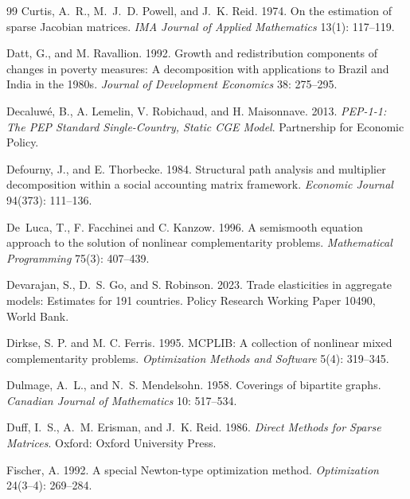 \begin{thebibliography}{99}
Curtis, A.~R., M.~J.~D. Powell, and J.~K. Reid. 1974.
\newblock On the estimation of sparse Jacobian matrices.
\newblock \emph{IMA Journal of Applied Mathematics} 13(1): 117--119.

Datt, G., and M. Ravallion. 1992.
\newblock Growth and redistribution components of changes in poverty
  measures: A decomposition with applications to {Brazil} and {India} in the
  1980s.
\newblock \emph{Journal of Development Economics} 38: 275--295.

Decaluw\'e, B., A. Lemelin, V. Robichaud, and H. Maisonnave. 2013.
\newblock \emph{PEP-1-1: The PEP Standard Single-Country, Static CGE Model}.
\newblock Partnership for Economic Policy.

Defourny, J., and E. Thorbecke. 1984.
\newblock Structural path analysis and multiplier decomposition within a
  social accounting matrix framework.
\newblock \emph{Economic Journal} 94(373): 111--136.

De~Luca, T., F. Facchinei and C. Kanzow. 1996.
\newblock A semismooth equation approach to the solution of nonlinear
  complementarity problems.
\newblock \emph{Mathematical Programming} 75(3): 407--439.

Devarajan, S., D.~S. Go, and S. Robinson. 2023.
\newblock Trade elasticities in aggregate models: Estimates for 191
  countries.
\newblock Policy Research Working Paper 10490, World Bank.

Dirkse, S. P. and M. C. Ferris. 1995.
\newblock MCPLIB: A collection of nonlinear mixed complementarity problems.
\newblock \emph{Optimization Methods and Software} 5(4): 319--345.

Dulmage, A.~L., and N.~S. Mendelsohn. 1958.
\newblock Coverings of bipartite graphs.
\newblock \emph{Canadian Journal of Mathematics} 10: 517--534.

Duff, I.~S., A.~M. Erisman, and J.~K. Reid. 1986.
\newblock \emph{Direct Methods for Sparse Matrices}.
\newblock Oxford: Oxford University Press.

Fischer, A. 1992.
\newblock A special Newton-type optimization method.
\newblock \emph{Optimization} 24(3--4): 269--284.


\end{thebibliography}
